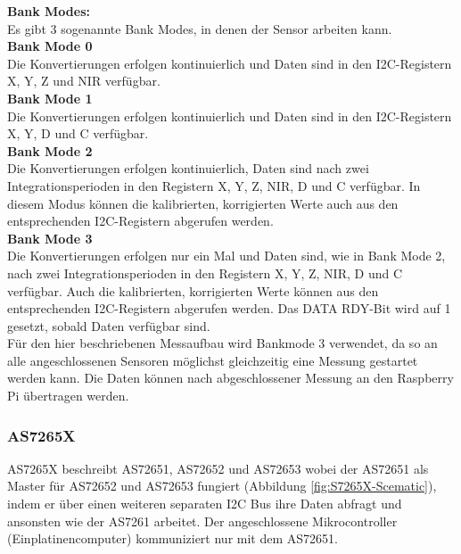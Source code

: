 \noindent \textbf{Bank Modes:}\\
\label{sec_bank_modes}
Es gibt 3 sogenannte Bank Modes, in denen der Sensor arbeiten kann.\\
\textbf{Bank Mode 0}\\
Die Konvertierungen erfolgen kontinuierlich und Daten sind in den I2C-Registern X, Y, Z und NIR verfügbar.\\
\textbf{Bank Mode 1}\\
Die Konvertierungen erfolgen kontinuierlich und Daten sind in den I2C-Registern X, Y, D und C verfügbar.\\
\textbf{Bank Mode 2}\\
Die Konvertierungen erfolgen kontinuierlich, Daten sind nach zwei Integrationsperioden in den Registern X, Y, Z, NIR, D und C verfügbar. 
In diesem Modus können die kalibrierten, korrigierten Werte auch aus den entsprechenden I2C-Registern abgerufen werden.\\
\newpage
\noindent \textbf{Bank Mode 3}\\
Die Konvertierungen erfolgen nur ein Mal und Daten sind, wie in Bank Mode 2, nach zwei Integrationsperioden in den Registern X, Y, Z, NIR, D und C verfügbar.
Auch die kalibrierten, korrigierten Werte können aus den entsprechenden I2C-Registern abgerufen werden.
Das DATA RDY-Bit wird auf 1 gesetzt, sobald Daten verfügbar sind.\\
Für den hier beschriebenen Messaufbau wird Bankmode 3 verwendet, da so an alle angeschlossenen Sensoren möglichst gleichzeitig eine Messung gestartet werden kann.
Die Daten können nach abgeschlossener Messung an den Raspberry Pi übertragen werden.

\subsubsection{AS7265X}\label{AS7265X}
AS7265X beschreibt AS72651, AS72652 und AS72653 wobei der AS72651 als Master für AS72652 und AS72653 fungiert (Abbildung \ref{fig:S7265X-Scematic}), indem er über einen weiteren separaten I2C Bus ihre Daten abfragt und ansonsten wie der AS7261 arbeitet.
Der angeschlossene Mikrocontroller (Einplatinencomputer) kommuniziert nur mit dem AS72651.

